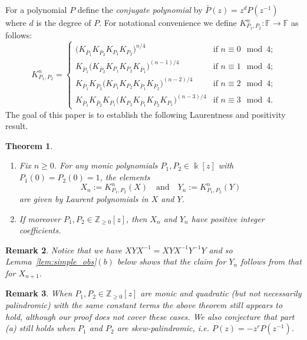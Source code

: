 \documentclass{amsart}
\newtheorem{theorem}{Theorem}[section]
\newtheorem{remark}[theorem]{Remark}
\newcommand{\FF}{\mathbb{F}}
\newcommand{\kk}{\Bbbk}
\newcommand{\ZZ}{\mathbb{Z}}
\newenvironment{enumeratea}{\begin{enumerate}[\upshape (a)]}
                           {\end{enumerate}}
\begin{document}
 For a polynomial $P$ define the \emph{conjugate polynomial} by $\bar{P}(z)=z^dP(z^{-1})$ where $d$ is the degree of $P$.  For notational convenience we define $K_{P_1,P_2}^n:\FF\to\FF$ as follows:
 \begin{equation}
  K_{P_1,P_2}^n=\begin{cases}\big(K_{\bar{P}_1}K_{\bar{P}_2}K_{P_1}K_{P_2}\big)^{n/4} & \text{if $n\equiv 0 \mod 4$;}\\ K_{\bar{P}_1}\big(K_{\bar{P}_2}K_{P_1}K_{P_2}K_{\bar{P}_1}\big)^{(n-1)/4} & \text{if $n\equiv 1 \mod 4$;}\\ K_{\bar{P}_1}K_{\bar{P}_2}\big(K_{P_1}K_{P_2}K_{\bar{P}_1}K_{\bar{P}_2}\big)^{(n-2)/4} & \text{if $n\equiv 2 \mod 4$;}\\ K_{\bar{P}_1}K_{\bar{P}_2}K_{P_1}\big(K_{P_2}K_{\bar{P}_1}K_{\bar{P}_2}K_{P_1}\big)^{(n-3)/4} & \text{if $n\equiv 3 \mod 4$.}\end{cases}
 \end{equation}
 The goal of this paper is to establish the following Laurentness and positivity result.
 \begin{theorem}\label{th:poly_positivity}\mbox{}
  \begin{enumeratea}
   \item Fix $n\ge0$.  For any monic polynomials $P_1,P_2\in\kk[z]$ with $P_1(0)=P_2(0)=1$, the elements \[X_n:=K_{P_1,P_2}^n(X)\quad\text{and}\quad Y_n:=K_{P_1,P_2}^n(Y)\]
   are given by Laurent polynomials in $X$ and $Y$.
   \item If moreover $P_1,P_2\in\ZZ_{\ge0}[z]$, then $X_n$ and $Y_n$ have positive integer coefficients.
  \end{enumeratea}
 \end{theorem}
 \begin{remark}
  Notice that we have $XYX^{-1}=XYX^{-1}Y^{-1}Y$ and so Lemma~\ref{lem:simple_obs}$(b)$ below shows that the claim for $Y_n$ follows from that for $X_{n+1}$.
 \end{remark}
 \begin{remark}\label{rm:quadratic}
  When $P_1,P_2\in \ZZ_{\ge0}[z]$ are monic and quadratic (but not necessarily palindromic) with the same constant terms the above theorem still appears to hold, although our proof does not cover these cases.  We also conjecture that part (a) still holds when $P_1$ and $P_2$ are skew-palindromic, i.e. $P(z)=-z^rP(z^{-1})$.
 \end{remark}
\end{document}
